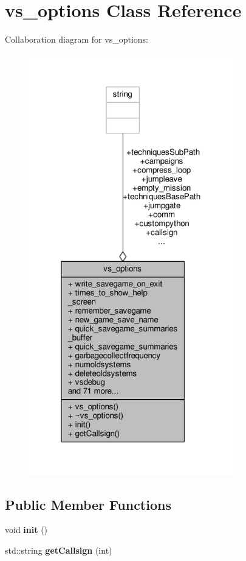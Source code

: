 \hypertarget{classvs__options}{}\section{vs\+\_\+options Class Reference}
\label{classvs__options}


Collaboration diagram for vs\+\_\+options\+:
\nopagebreak
\begin{figure}[H]
\begin{center}
\leavevmode
\includegraphics[width=253pt]{dd/dae/classvs__options__coll__graph}
\end{center}
\end{figure}
\subsection*{Public Member Functions}
\begin{DoxyCompactItemize}
\item 
void {\bfseries init} ()\hypertarget{classvs__options_a2db19a0081fae5aefaa4c2ad6e78de47}{}\label{classvs__options_a2db19a0081fae5aefaa4c2ad6e78de47}

\item 
std\+::string {\bfseries get\+Callsign} (int)\hypertarget{classvs__options_a21ea47d2722ef49da4bb71b4c13fb5c8}{}\label{classvs__options_a21ea47d2722ef49da4bb71b4c13fb5c8}

\end{DoxyCompactItemize}
